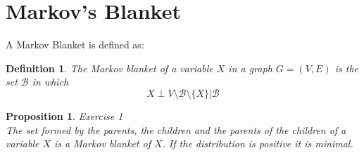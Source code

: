 \documentclass{amsart}
\theoremstyle{plain}
\newtheorem*{definition}{Definition}
\newtheorem{proposition}{Proposition}
\begin{document}
\section{Markov's Blanket}

A Markov Blanket is defined as:

\begin{definition}
  The Markov blanket of a variable $X$ in a graph $G=(V,E)$ is the set $\mathcal{B}$ in which
  \begin{equation*}
    X\perp V\setminus\mathcal{B}\setminus\{X\}|\mathcal{B}
  \end{equation*}
\end{definition}

\begin{proposition} Exercise 1\\
  The set formed by the parents, the children and the parents of the children of a variable $X$ is
  a Markov blanket of $X$. If the distribution is positive it is minimal.
\end{proposition}
\end{document}

